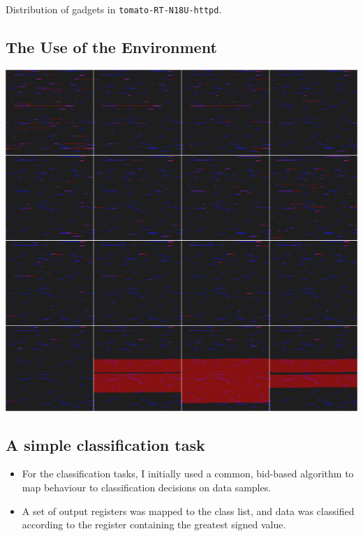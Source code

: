 \documentclass[11pt]{article}
\begin{document}
Distribution of gadgets in \texttt{tomato-RT-N18U-httpd}.

\subsection*{The Use of the Environment}
\label{sec:orgb5bfec0}
\begin{center}
\includegraphics[width=.9\linewidth]{./img/fimjek_heatmap_montage.png}
\end{center}


\subsection*{A simple classification task}
\label{sec:org18386ec}
\begin{itemize}
\item For the classification tasks, I initially used a common, bid-based algorithm to map behaviour to classification decisions on data samples.
\item A set of output registers was mapped to the class list, and data was classified according to the register containing the greatest signed value.
\end{itemize}
\end{document}
